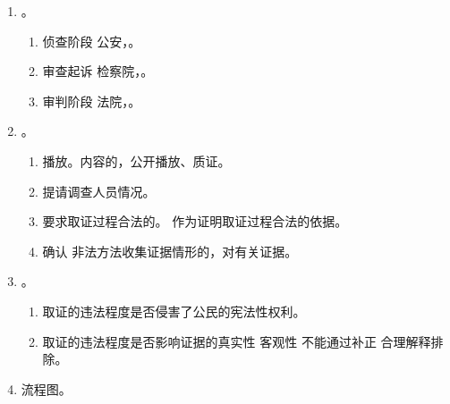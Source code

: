 \begin{enumerate}
\begin{enumerate}
\begin{enumerate}
\begin{enumerate}
                          \item 原则开庭前提出申请，庭审期间发现相关线索、材料的除外。
                          \item 被告及其辩护申请排非需要。。
                          \item 应当。
                        \end{enumerate}
                  \item {}。应当、确有疑问的 \yjt 应当进行调查（）。
                        \begin{enumerate}
                          \item 有 \yjt 应当，防止，最迟完成证据的合法性调查。
                          \item 没有 \yjt 应当申请。
                        \end{enumerate}
                  \item 二审。。
                \end{enumerate}
          \item {}。
                \begin{enumerate}
                  \item 侦查阶段 \yjt 公安，。
                  \item 审查起诉 \yjt 检察院，。
                  \item 审判阶段 \yjt 法院，。
                \end{enumerate}
          \item {}。
                \begin{enumerate}
                  \item 播放。内容的，公开播放、质证。
                  \item 提请调查人员情况。
                  \item 要求取证过程合法的。 \yjt {}作为证明取证过程合法的依据。
                  \item 确认 \hz {}非法方法收集证据情形的，对有关证据。
                \end{enumerate}
          \item {}。
                \begin{enumerate}
                  \item 取证的违法程度是否侵害了公民的宪法性权利。
                  \item 取证的违法程度是否影响证据的真实性 \hz 客观性 \yjt 不能通过补正 \hz 合理解释排除。
                \end{enumerate}
          \item 流程图。
        \end{enumerate}
\end{enumerate}
